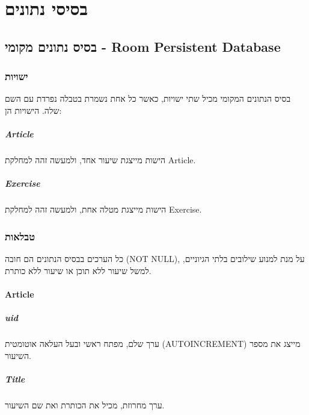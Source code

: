 \chapter{בסיסי נתונים}

\section{בסיס נתונים מקומי - Room Persistent Database}

\subsection{ישויות}

בסיס הנתונים המקומי מכיל שתי ישויות, כאשר כל אחת נשמרת בטבלה נפרדת עם השם שלה.
הישויות הן:

\paragraph{Article}

הישות מייצגת שיעור אחד, ולמעשה זהה למחלקת Article.

\paragraph{Exercise}

הישות מייצגת מטלה אחת, ולמעשה זהה למחלקת Exercise.

\subsection{טבלאות}

כל הערכים בבסיס הנתונים הם חובה (NOT NULL), על מנת למנוע שילובים בלתי הגיוניים,
למשל שיעור ללא תוכן או שיעור ללא כותרת.

\subsubsection*{Article}
\paragraph{uid}

ערך שלם, מפתח ראשי ובעל העלאה אוטומטית (AUTOINCREMENT) מייצג את מספר השיעור.

\paragraph{Title}

ערך מחרוזת, מכיל את הכותרת ואת שם השיעור.

